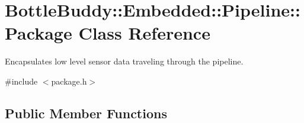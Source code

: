 \hypertarget{class_bottle_buddy_1_1_embedded_1_1_pipeline_1_1_package}{}\section{Bottle\+Buddy\+:\+:Embedded\+:\+:Pipeline\+:\+:Package Class Reference}
\label{class_bottle_buddy_1_1_embedded_1_1_pipeline_1_1_package}


Encapsulates low level sensor data traveling through the pipeline.  




{\ttfamily \#include $<$package.\+h$>$}

\subsection*{Public Member Functions}
